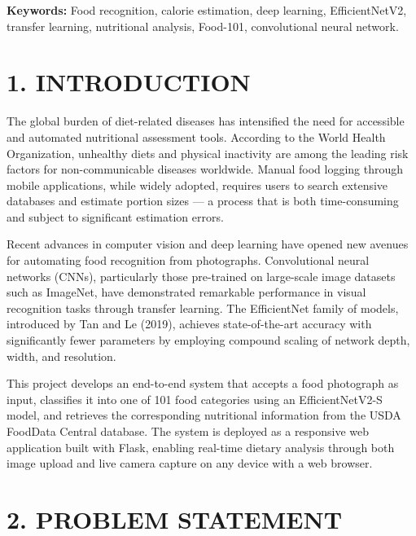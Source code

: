 \documentclass[12pt,a4paper]{article}
\begin{document}
\textbf{Keywords:} Food recognition, calorie estimation, deep learning, EfficientNetV2, transfer learning, nutritional analysis, Food-101, convolutional neural network.


\newpage
\section{1. INTRODUCTION}

The global burden of diet-related diseases has intensified the need for accessible and automated nutritional assessment tools. According to the World Health Organization, unhealthy diets and physical inactivity are among the leading risk factors for non-communicable diseases worldwide. Manual food logging through mobile applications, while widely adopted, requires users to search extensive databases and estimate portion sizes --- a process that is both time-consuming and subject to significant estimation errors.

Recent advances in computer vision and deep learning have opened new avenues for automating food recognition from photographs. Convolutional neural networks (CNNs), particularly those pre-trained on large-scale image datasets such as ImageNet, have demonstrated remarkable performance in visual recognition tasks through transfer learning. The EfficientNet family of models, introduced by Tan and Le (2019), achieves state-of-the-art accuracy with significantly fewer parameters by employing compound scaling of network depth, width, and resolution.

This project develops an end-to-end system that accepts a food photograph as input, classifies it into one of 101 food categories using an EfficientNetV2-S model, and retrieves the corresponding nutritional information from the USDA FoodData Central database. The system is deployed as a responsive web application built with Flask, enabling real-time dietary analysis through both image upload and live camera capture on any device with a web browser.


\newpage
\section{2. PROBLEM STATEMENT}
\end{document}
